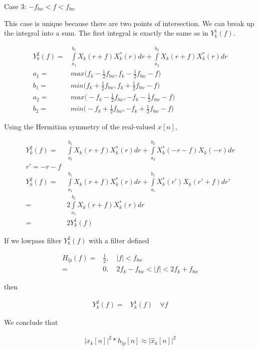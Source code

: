 \documentclass [11pt, proquest,oneside] {uwthesis}[2015/03/03]
\begin{document}
Case 3: $- f_{bw} < f < f_{bw}$

This case is unique because there are two points of intersection.  We can break up the integral into a sum.  The first integral is exactly the same as in $Y^1_k(f)$.

\begin{align}
Y_{k}^2(f) =& \int\limits_{a_1}^{b_1} X_{k}(r + f) X_{k}^*(r)dr + \int\limits_{a_2}^{b_2} X_{k}(r + f) X_{k}^*(r)dr \\
a_1 =& max\Big( f_k - \frac{1}{2} f_{bw},  f_k - \frac{1}{2} f_{bw} - f\Big) \\
b_1 =& min\Big( f_k + \frac{1}{2} f_{bw},  f_k + \frac{1}{2} f_{bw} - f\Big) \\
a_2 =& max\Big( -f_k - \frac{1}{2} f_{bw},  -f_k - \frac{1}{2} f_{bw} - f\Big) \\
b_2 =& min\Big( -f_k + \frac{1}{2} f_{bw},  -f_k + \frac{1}{2} f_{bw} - f\Big)
\end{align}

Using the Hermitian symmetry of the real-valued $x[n]$,

\begin{align}
Y_{k}^2(f) =& \int\limits_{a_1}^{b_1} X_{k}(r + f) X_{k}^*(r)dr + \int\limits_{a_2}^{b_2} X_{k}^*(-r - f) X_{k}(-r)dr \\
r' = -r - f \nonumber \\
Y_{k}^2(f) =& \int\limits_{a_1}^{b_1} X_{k}(r + f) X_{k}^*(r)dr + \int\limits_{a_1}^{b_1} X_{k}^*(r') X_{k}(r' + f)dr' \\
=& 2 \int\limits_{a_1}^{b_1} X_{k}(r + f) X_{k}^*(r)dr \\
=& 2 Y_k^1(f)
\end{align}

If we lowpass filter $Y_k^2(f)$ with a filter defined

\begin{align}
H_{lp}(f) =& \frac{1}{2}, \quad |f| < f_{bw} \\
=& 0, \quad 2f_k - f_{bw} < |f| < 2f_k + f_{bw}
\end{align}

then

\begin{align}
Y_{k}^2(f) =& Y_k^1(f) \quad \forall f
\end{align}

We conclude that 

\begin{align}
\label{eq:squared_cis_hilbert}
\Big| x_k[n] \Big|^2 * h_{lp}[n] \approx \Big| \widehat{x}_k[n] \Big|^2
\end{align}
\end{document}

